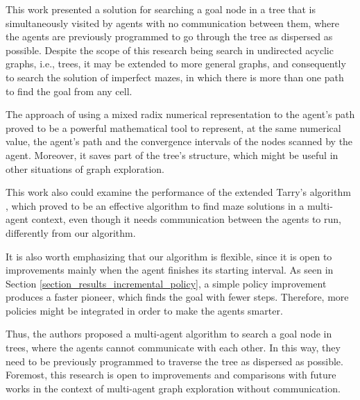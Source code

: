 This work presented a solution for searching a goal node in a tree that is simultaneously visited by agents with no communication between them, where the agents are previously programmed to go through the tree as dispersed as possible. Despite the scope of this research being search in undirected acyclic graphs, i.e., trees, it may be extended to more general graphs, and consequently to search the solution of imperfect mazes, in which there is more than one path to find the goal from any cell.

The approach of using a mixed radix numerical representation to the agent's path proved to be a powerful mathematical tool to represent, at the same numerical value, the agent's path and the convergence intervals of the nodes scanned by the agent. Moreover, it saves part of the tree's structure, which might be useful in other situations of graph exploration.

This work also could examine the performance of the extended Tarry's algorithm \cite{KivelevitchCohen2010}, which proved to be an effective algorithm to find maze solutions in a multi-agent context, even though it needs communication between the agents to run, differently from our algorithm.

It is also worth emphasizing that our algorithm is flexible, since it is open to improvements mainly when the agent finishes its starting interval. As seen in Section \ref{section_results_incremental_policy}, a simple policy improvement produces a faster pioneer, which finds the goal with fewer steps. Therefore, more policies might be integrated in order to make the agents smarter.

Thus, the authors proposed a multi-agent algorithm to search a goal node in trees, where the agents cannot communicate with each other. In this way, they need to be previously programmed to traverse the tree as dispersed as possible. Foremost, this research is open to improvements and comparisons with future works in the context of multi-agent graph exploration without communication.